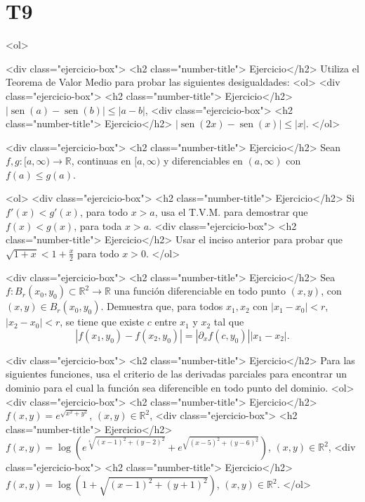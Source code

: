 \documentclass{article}
\theoremstyle{definition}
\newcommand{\sen}{\operatorname{sen}}
\begin{document}
  \section*{T9 }


  <ol>



  <div class="ejercicio-box"> <h2 class="number-title"> Ejercicio</h2>\label{Ejer:DesigualdadesAplicandoTVM}
    Utiliza el Teorema de Valor Medio para probar las siguientes desigualdades:
<ol>
<div class="ejercicio-box"> <h2 class="number-title"> Ejercicio</h2> $|\sen(a)-\sen(b)| \leq |a-b|$,
<div class="ejercicio-box"> <h2 class="number-title"> Ejercicio</h2> $|\sen(2x)-\sen(x)| \leq |x|$.
</ol>


<div class="ejercicio-box"> <h2 class="number-title"> Ejercicio</h2> Sean $f,g:[a,\infty)\to \mathbb{R}$, continuas en $[a,\infty)$ y diferenciables en $(a,\infty)$ con
$f(a) \leq g(a)$.

<ol>
<div class="ejercicio-box"> <h2 class="number-title"> Ejercicio</h2> Si $f'(x) < g'(x)$, para todo $x>a$, usa el T.V.M. para demostrar que $f(x) < g(x)$, para toda $x>a$.
<div class="ejercicio-box"> <h2 class="number-title"> Ejercicio</h2> Usar el inciso anterior para probar que $\sqrt{1+x}< 1+\frac{x}{2}$ para todo $x>0$.
</ol>    
  
<div class="ejercicio-box"> <h2 class="number-title"> Ejercicio</h2> Sea $f:B_r(x_0,y_0)\subset \mathbb{R}^2 \to \mathbb{R}$ una función diferenciable en todo
  punto $(x,y)$, con $(x,y)\in B_r(x_0,y_0)$. Demuestra que, para todos $x_1,x_2$ con $|x_1-x_0|<r$,
  $|x_2-x_0|<r$, se tiene que existe $c$ entre $x_1$ y $x_2$ tal que
  $$
  |f(x_1,y_0)-f(x_2,y_0)| = |\partial_xf(c,y_0)||x_1-x_2|.
  $$

  <div class="ejercicio-box"> <h2 class="number-title"> Ejercicio</h2> Para las siguientes funciones, usa el criterio
    de las derivadas parciales para encontrar  un dominio
    para el cual la función sea diferencible en
    todo punto del dominio.
    <ol>
    <div class="ejercicio-box"> <h2 class="number-title"> Ejercicio</h2> $f(x,y)=e^{\sqrt{x^2+y^2}}$,  $(x,y)\in \mathbb{R}^2$,
    <div class="ejercicio-box"> <h2 class="number-title"> Ejercicio</h2> $f(x,y)=\log(e^{\sqrt[4]{(x-1)^2+(y-2)^2}}+e^{\sqrt{(x-5)^2+(y-6)^2}})$,
      $(x,y)\in \mathbb{R}^2$,
      <div class="ejercicio-box"> <h2 class="number-title"> Ejercicio</h2> $f(x,y)=\log(1+\sqrt{(x-1)^2+(y+1)^2})$, $(x,y)\in \mathbb{R}^2$.
    </ol>
    
\end{document}
